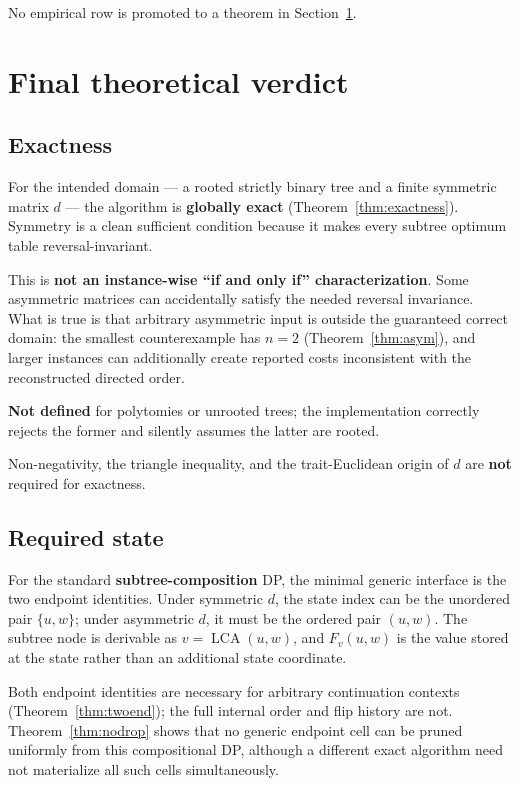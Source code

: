 \documentclass[11pt]{article}
\theoremstyle{plain}
\newcommand{\LCA}{\operatorname{LCA}}
\begin{document}
No empirical row is promoted to a theorem in Section~\ref{sec:verdict}.

\section{Final theoretical verdict}
\label{sec:verdict}

\subsection{Exactness}

For the intended domain --- a rooted strictly binary tree and a finite symmetric
matrix \(d\) --- the algorithm is \textbf{globally exact}
(Theorem~\ref{thm:exactness}). Symmetry is a clean sufficient condition because
it makes every subtree optimum table reversal-invariant.

This is \textbf{not an instance-wise ``if and only if'' characterization}. Some
asymmetric matrices can accidentally satisfy the needed reversal invariance.
What is true is that arbitrary asymmetric input is outside the guaranteed
correct domain: the smallest counterexample has \(n=2\)
(Theorem~\ref{thm:asym}), and larger instances can additionally create reported
costs inconsistent with the reconstructed directed order.

\textbf{Not defined} for polytomies or unrooted trees; the implementation
correctly rejects the former and silently assumes the latter are rooted.

Non-negativity, the triangle inequality, and the trait-Euclidean origin of \(d\)
are \textbf{not} required for exactness.

\subsection{Required state}

For the standard \textbf{subtree-composition} DP, the minimal generic interface
is the two endpoint identities. Under symmetric \(d\), the state index can be
the unordered pair \(\{u,w\}\); under asymmetric \(d\), it must be the ordered
pair \((u,w)\). The subtree node is derivable as \(v=\LCA(u,w)\), and
\(F_v(u,w)\) is the value stored at the state rather than an additional state
coordinate.

Both endpoint identities are necessary for arbitrary continuation contexts
(Theorem~\ref{thm:twoend}); the full internal order and flip history are not.
Theorem~\ref{thm:nodrop} shows that no generic endpoint cell can be pruned
uniformly from this compositional DP, although a different exact algorithm need
not materialize all such cells simultaneously.
\end{document}
